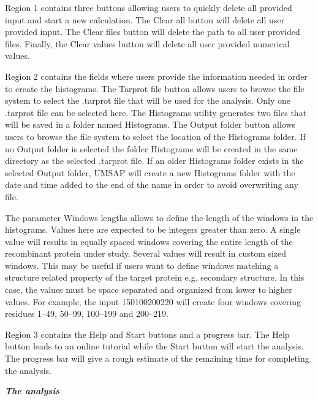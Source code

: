Region \num{1} contains three buttons allowing users to quickly delete all provided input and start a new calculation. The Clear all button will delete all user provided input. The Clear files button will delete the path to all user provided files. Finally, the Clear values button will delete all user provided numerical values.

Region \num{2} contains the fields where users provide the information needed in order to create the histograms. The Tarprot file button allows users to browse the file system to select the .tarprot file that will be used for the analysis. Only one .tarprot file can be selected here. The Histograms utility generates two files that will be saved in a folder named Histograms. The Output folder button allows users to browse the file system to select the location of the Histograms folder. If no Output folder is selected the folder Histograms will be created in the same directory as the selected .tarprot file. If an older Histograms folder exists in the selected Output folder, UMSAP will create a new Histograms folder with the date and time added to the end of the name in order to avoid overwriting any file. 

The parameter Windows lengths allows to define the length of the windows in the histograms. Values here are expected to be integers greater than zero. A single value will results in equally spaced windows covering the entire length of the recombinant protein under study. Several values will result in custom sized windows. This may be useful if users want to define windows matching a structure related property of the target protein e.g. secondary structure. In this case, the values must be space separated and organized from lower to higher values. For example, the input \numlist{1 50 100 200 220} will create four windows covering residues \numrange{1}{49}, \numrange{50}{99}, \numrange{100}{199} and \numrange{200}{219}.

Region \num{3} contains the Help and Start buttons and a progress bar. The Help button leads to an online tutorial while the Start button will start the analysis. The progress bar will give a rough estimate of the remaining time for completing the analysis.

\textit{\textbf{The analysis}}

